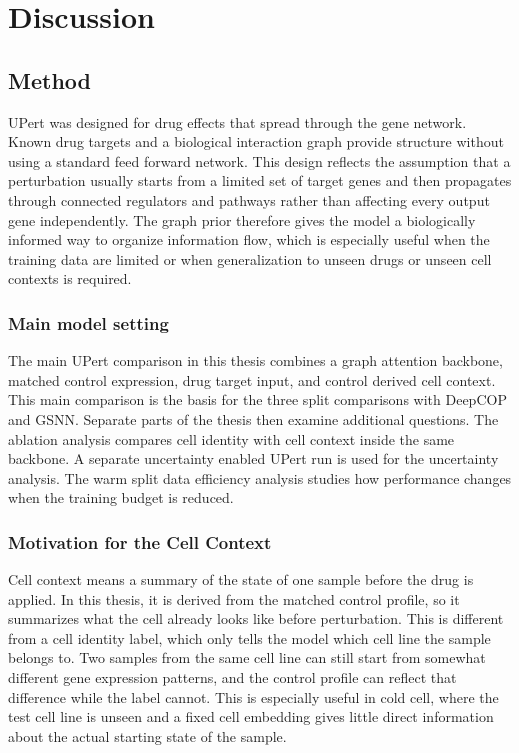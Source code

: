 \chapter{Discussion}

\section{Method}
\noindent UPert was designed for drug effects that spread through the gene network. Known drug targets and a biological interaction graph provide structure without using a standard feed forward network. This design reflects the assumption that a perturbation usually starts from a limited set of target genes and then propagates through connected regulators and pathways rather than affecting every output gene independently. The graph prior therefore gives the model a biologically informed way to organize information flow, which is especially useful when the training data are limited or when generalization to unseen drugs or unseen cell contexts is required.

\subsection{Main model setting}
\noindent The main UPert comparison in this thesis combines a graph attention backbone, matched control expression, drug target input, and control derived cell context. This main comparison is the basis for the three split comparisons with DeepCOP and GSNN. Separate parts of the thesis then examine additional questions. The ablation analysis compares cell identity with cell context inside the same backbone. A separate uncertainty enabled UPert run is used for the uncertainty analysis. The warm split data efficiency analysis studies how performance changes when the training budget is reduced.

\subsection{Motivation for the Cell Context}
\noindent Cell context means a summary of the state of one sample before the drug is applied. In this thesis, it is derived from the matched control profile, so it summarizes what the cell already looks like before perturbation. This is different from a cell identity label, which only tells the model which cell line the sample belongs to. Two samples from the same cell line can still start from somewhat different gene expression patterns, and the control profile can reflect that difference while the label cannot. This is especially useful in cold cell, where the test cell line is unseen and a fixed cell embedding gives little direct information about the actual starting state of the sample.

